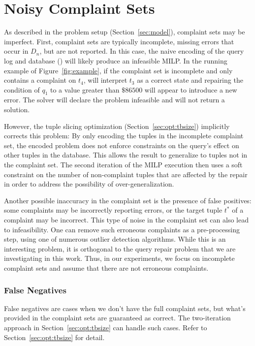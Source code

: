 
\section{Noisy Complaint Sets}
\label{sec:noise}

As described in the problem setup (Section~\ref{sec:model}), complaint
sets may be imperfect. First, complaint sets are typically incomplete,
missing errors that occur in $D_n$, but are not reported. In this
case, the naive encoding of the query log and database (\naive) will
likely produce an infeasible MILP. In the running example of
Figure~\ref{fig:example}, if the complaint set is incomplete and only
contains a complaint on $t_4$, \naive will interpret $t_3$ as a
correct state and repairing the condition of $q_1$ to a value greater
than $\$86500$ will appear to introduce a new error. The solver will
declare the problem infeasible and will not return a solution.



However, the tuple slicing optimization (Section~\ref{sec:opt:tbsize})
implicitly corrects this problem: By only encoding the tuples in the
incomplete complaint set, the encoded problem does not enforce
constraints on the query's effect on other tuples in the database.
This allows the result to generalize to tuples not in the complaint
set. The second iteration of the MILP execution then uses a soft
constraint on the number of non-complaint tuples that are affected by
the repair in order to address the possibility of over-generalization.

Another possible inaccuracy in the complaint set is the presence of
false positives: some complaints may be incorrectly reporting errors,
or the target tuple $t^*$ of a complaint may be incorrect. This type
of noise in the complaint set can also lead to infeasibility. One can
remove such erroneous complaints as a pre-processing step, using one
of numerous outlier detection algorithms. While this is an
interesting problem, it is orthogonal to the query repair problem that
we are investigating in this work. Thus, in our experiments, we focus
on incomplete complaint sets and assume that there are not erroneous
complaints.


  \subsubsection{False Negatives}
  False negatives are cases when we don't have the full complaint sets, but
  what's provided in the complaint sets are guaranteed as correct. The 
  two-iteration approach in Section~\ref{sec:opt:tbsize} can handle 
  such cases. Refer to Section~\ref{sec:opt:tbsize} for detail.



